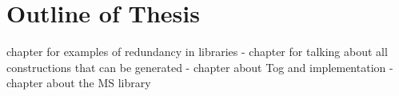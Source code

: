 


\section{Outline of Thesis}
chapter for examples of redundancy in libraries - 
chapter for talking about all constructions that can be generated - 
chapter about Tog and implementation - 
chapter about the MS library  

